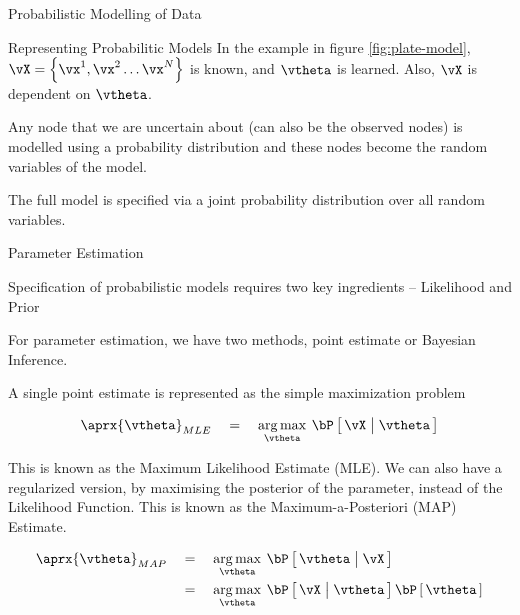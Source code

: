\documentclass{article}
\begin{document}
\begin{ssection}{Probabilistic Modelling of Data}
\begin{ssubsection}{Representing Probabilitic Models}
		In the example in figure \ref{fig:plate-model}, $\vX = \set{\vx^1, \vx^2 \dots \vx^N}$ is known, and $\vtheta$ is learned. Also, $\vX$ is dependent on $\vtheta$. \br

		 \br

		Any node that we are uncertain about (can also be the observed nodes) is modelled using a probability distribution and these nodes become the random variables of the model. \br

		The full model is specified via a joint probability distribution over all random variables.

	\end{ssubsection}

	\begin{ssubsection}{Parameter Estimation}

		Specification of probabilistic models requires two key ingredients -- Likelihood and Prior \br

		 \br

		 \br

		For parameter estimation, we have two methods, point estimate or Bayesian Inference. \br

		A single point estimate is represented as the simple maximization problem

		\begin{align*}
			\aprx{\vtheta}_{MLE}	\eq	\argmax{\vtheta} \prob{\vX \pipe \vtheta}
		\end{align*}

		This is known as the Maximum Likelihood Estimate (MLE). We can also have a regularized version, by maximising the posterior of the parameter, instead of the Likelihood Function. This is known as the Maximum-a-Posteriori (MAP) Estimate. \br

		\begin{align*}
			\aprx{\vtheta}_{MAP}	&\eq	\argmax{\vtheta} \prob{\vtheta \pipe \vX} \\
									&\eq	\argmax{\vtheta} \prob{\vX \pipe \vtheta} \prob{\vtheta}
		\end{align*}
		

\end{ssubsection}
\end{ssection}
\end{document}
